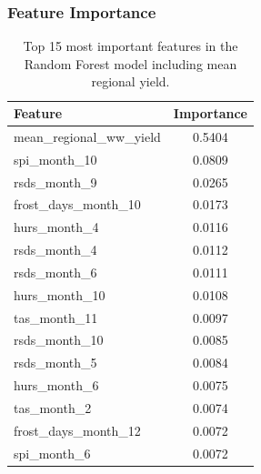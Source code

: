 \documentclass{article}
\begin{document}
\subsubsection{Feature Importance}
\begin{table}[H]
	\centering
	\begin{tabular}{lc}
		\hline
		Feature                   & Importance \\
		\hline
		mean\_regional\_ww\_yield & 0.5404     \\
		spi\_month\_10            & 0.0809     \\
		rsds\_month\_9            & 0.0265     \\
		frost\_days\_month\_10    & 0.0173     \\
		hurs\_month\_4            & 0.0116     \\
		rsds\_month\_4            & 0.0112     \\
		rsds\_month\_6            & 0.0111     \\
		hurs\_month\_10           & 0.0108     \\
		tas\_month\_11            & 0.0097     \\
		rsds\_month\_10           & 0.0085     \\
		rsds\_month\_5            & 0.0084     \\
		hurs\_month\_6            & 0.0075     \\
		tas\_month\_2             & 0.0074     \\
		frost\_days\_month\_12    & 0.0072     \\
		spi\_month\_6             & 0.0072     \\
		\hline
	\end{tabular}
	\caption{Top 15 most important features in the Random Forest model including mean regional yield.}
\end{table}
\end{document}
